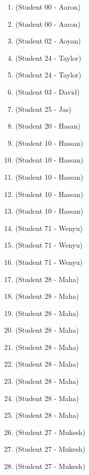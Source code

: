 \begin{enumerate}[label=\#\arabic*]
\item \cite{fan85debruijn} (Student 00 - Aaron)
\item \cite{shiu1997decoding} (Student 00 - Aaron)
\item \cite{chung1992universal} (Student 02 - Aoyan)
\item \cite{ivanyi1988construction} (Student 24 - Taylor)
\item \cite{paterson1996new} (Student 24 - Taylor)
\item \cite{mitchell1994decoding} (Student 03 - David)
\item \cite{etzion2025bruijn} (Student 25 - Jas)
\item \cite{fredricksen1982survey} (Student 20 - Hasan)
\item \cite{siu1997combinatorics} (Student 10 - Hassan)
\item \cite{denes1990new} (Student 10 - Hassan)
\item \cite{etzion1988constructions} (Student 10 - Hassan)
\item \cite{hurlbert1996existence} (Student 10 - Hassan)
\item \cite{nissanov1995brain} (Student 10 - Hassan)
\item \cite{becher2024nested} (Student 71 - Wenyu)
\item \cite{condon2024bruijn} (Student 71 - Wenyu)
\item \cite{etzion1999linear} (Student 71 - Wenyu)
\item \cite{hurlbert1993bruijn} (Student 28 - Maha)
\item \cite{cock1988toroidal} (Student 28 - Maha)
\item \cite{kim2002existence} (Student 28 - Maha)
\item \cite{kanetkar1980construction} (Student 28 - Maha)
\item \cite{horvath2008growing} (Student 28 - Maha)
\item \cite{hurlbert1995new} (Student 28 - Maha)
\item \cite{kang2026bruijn} (Student 28 - Maha)
\item \cite{calvin1996matrix} (Student 28 - Maha)
\item \cite{stelldinger2025bruijn} (Student 28 - Maha)
\item \cite{isaak1994meshing} (Student 27 - Mukesh)
\item \cite{chen2024robot} (Student 27 - Mukesh)
\item \cite{ohtsuka1993proof}(Student 27 - Mukesh)

\end{enumerate}
